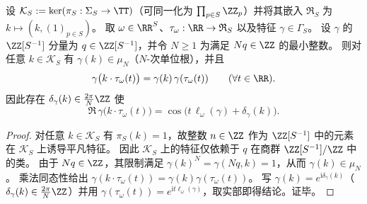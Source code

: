 \begin{proposition}[纤维平移的相位量子化]\label{prop:cdim-arithmetic-singular-ring-fiber-phase-quantization}
设 \(\mathcal{K}_S:=\ker(\pi_S:\Sigma_S\to\TT)\)（可同一化为 \(\prod_{p\in S}\ZZ_p\)）并将其嵌入 \(\mathfrak{R}_S\) 为 \(k\mapsto (k,(1)_{p\in S})\)。
取 \(\omega\in\RR^{S}\)、\(\tau_{\omega}:\RR\to\mathfrak{R}_S\) 以及特征 \(\gamma\in\Gamma_S\)。
设 \(\gamma\) 的 \(\ZZ[S^{-1}]\) 分量为 \(q\in\ZZ[S^{-1}]\)，并令 \(N\ge 1\) 为满足 \(Nq\in\ZZ\) 的最小整数。
则对任意 \(k\in \mathcal{K}_S\) 有 \(\gamma(k)\in\mu_N\)（\(N\)-次单位根），并且
\[
\gamma\bigl(k\cdot\tau_{\omega}(t)\bigr)=\gamma(k)\,\gamma(\tau_{\omega}(t))\qquad(\forall t\in\RR).
\]
因此存在 \(\delta_{\gamma}(k)\in\frac{2\pi}{N}\ZZ\) 使
\[
\Re\,\gamma\bigl(k\cdot\tau_{\omega}(t)\bigr)
=\cos\!\bigl(t\,\ell_{\omega}(\gamma)+\delta_{\gamma}(k)\bigr).
\]
\end{proposition}
\begin{proof}
对任意 \(k\in\mathcal{K}_S\) 有 \(\pi_S(k)=1\)，故整数 \(n\in\ZZ\) 作为 \(\ZZ[S^{-1}]\) 中的元素在 \(\mathcal{K}_S\) 上诱导平凡特征。
因此 \(\mathcal{K}_S\) 上的特征仅依赖于 \(q\) 在商群 \(\ZZ[S^{-1}]/\ZZ\) 中的类。
由于 \(Nq\in\ZZ\)，其限制满足 \(\gamma(k)^N=\gamma(Nq,k)=1\)，从而 \(\gamma(k)\in\mu_N\)。
乘法同态性给出 \(\gamma(k\cdot\tau_{\omega}(t))=\gamma(k)\gamma(\tau_{\omega}(t))\)。
写 \(\gamma(k)=e^{\mathrm{i}\delta_{\gamma}(k)}\)（\(\delta_{\gamma}(k)\in\frac{2\pi}{N}\ZZ\)）并用 \(\gamma(\tau_{\omega}(t))=e^{\mathrm{i}t\ell_{\omega}(\gamma)}\)，取实部即得结论。证毕。
\end{proof}

\endinput
